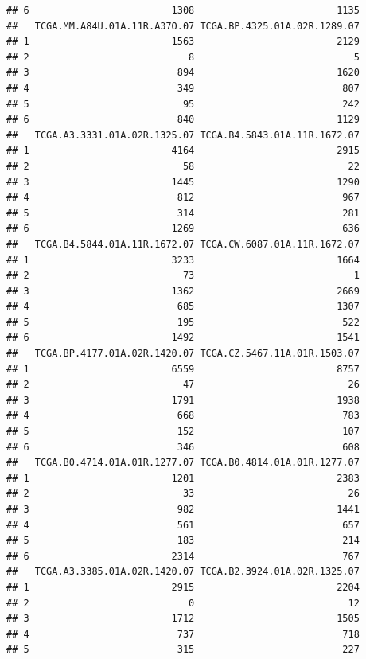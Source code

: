 \documentclass[
]{article}
\begin{document}
\begin{verbatim}
## 6                         1308                         1135
##   TCGA.MM.A84U.01A.11R.A37O.07 TCGA.BP.4325.01A.02R.1289.07
## 1                         1563                         2129
## 2                            8                            5
## 3                          894                         1620
## 4                          349                          807
## 5                           95                          242
## 6                          840                         1129
##   TCGA.A3.3331.01A.02R.1325.07 TCGA.B4.5843.01A.11R.1672.07
## 1                         4164                         2915
## 2                           58                           22
## 3                         1445                         1290
## 4                          812                          967
## 5                          314                          281
## 6                         1269                          636
##   TCGA.B4.5844.01A.11R.1672.07 TCGA.CW.6087.01A.11R.1672.07
## 1                         3233                         1664
## 2                           73                            1
## 3                         1362                         2669
## 4                          685                         1307
## 5                          195                          522
## 6                         1492                         1541
##   TCGA.BP.4177.01A.02R.1420.07 TCGA.CZ.5467.11A.01R.1503.07
## 1                         6559                         8757
## 2                           47                           26
## 3                         1791                         1938
## 4                          668                          783
## 5                          152                          107
## 6                          346                          608
##   TCGA.B0.4714.01A.01R.1277.07 TCGA.B0.4814.01A.01R.1277.07
## 1                         1201                         2383
## 2                           33                           26
## 3                          982                         1441
## 4                          561                          657
## 5                          183                          214
## 6                         2314                          767
##   TCGA.A3.3385.01A.02R.1420.07 TCGA.B2.3924.01A.02R.1325.07
## 1                         2915                         2204
## 2                            0                           12
## 3                         1712                         1505
## 4                          737                          718
## 5                          315                          227

\end{verbatim}
\end{document}
